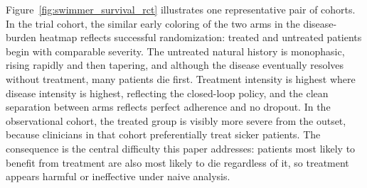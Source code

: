 Figure~\ref{fig:swimmer_survival_rct} illustrates one representative pair of cohorts. In the trial cohort, the similar early coloring of the two arms in the
disease-burden heatmap reflects successful randomization: treated and untreated patients begin with
comparable severity. The untreated natural history is monophasic, rising rapidly and then tapering,
and although the disease eventually resolves without treatment, many patients die first. Treatment
intensity is highest where disease intensity is highest, reflecting the closed-loop policy, and the
clean separation between arms reflects perfect adherence and no dropout. In the observational cohort,
the treated group is visibly more severe from the outset, because clinicians in that cohort
preferentially treat sicker patients. The consequence is the central difficulty this paper addresses:
patients most likely to benefit from treatment are also most likely to die regardless of it, so
treatment appears harmful or ineffective under naive analysis.

